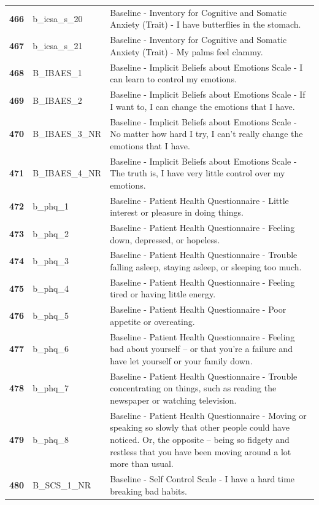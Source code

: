 \documentclass[
  letterpaper,
  DIV=11,
  numbers=noendperiod]{scrartcl}
\begin{document}
\begin{longtable}[t]{>{}cll}
\addlinespace
\textbf{466} & b\_icsa\_s\_20 & Baseline - Inventory for Cognitive and Somatic Anxiety (Trait) - I have butterflies in the stomach.\\
\textbf{467} & b\_icsa\_s\_21 & Baseline - Inventory for Cognitive and Somatic Anxiety (Trait) - My palms feel clammy.\\
\textbf{468} & B\_IBAES\_1 & Baseline - Implicit Beliefs about Emotions Scale - I can learn to control my emotions.\\
\textbf{469} & B\_IBAES\_2 & Baseline - Implicit Beliefs about Emotions Scale - If I want to, I can change the emotions that I have.\\
\textbf{470} & B\_IBAES\_3\_NR & Baseline - Implicit Beliefs about Emotions Scale - No matter how hard I try, I can’t really change the emotions that I have.\\
\addlinespace
\textbf{471} & B\_IBAES\_4\_NR & Baseline - Implicit Beliefs about Emotions Scale - The truth is, I have very little control over my emotions.\\
\textbf{472} & b\_phq\_1 & Baseline - Patient Health Questionnaire - Little interest or pleasure in doing things.\\
\textbf{473} & b\_phq\_2 & Baseline - Patient Health Questionnaire - Feeling down, depressed, or hopeless.\\
\textbf{474} & b\_phq\_3 & Baseline - Patient Health Questionnaire - Trouble falling asleep, staying asleep, or sleeping too much.\\
\textbf{475} & b\_phq\_4 & Baseline - Patient Health Questionnaire - Feeling tired or having little energy.\\
\addlinespace
\textbf{476} & b\_phq\_5 & Baseline - Patient Health Questionnaire - Poor appetite or overeating.\\
\textbf{477} & b\_phq\_6 & Baseline - Patient Health Questionnaire - Feeling bad about yourself -- or that you're a failure and have let yourself or your family down.\\
\textbf{478} & b\_phq\_7 & Baseline - Patient Health Questionnaire - Trouble concentrating on things, such as reading the newspaper or watching television.\\
\textbf{479} & b\_phq\_8 & Baseline - Patient Health Questionnaire - Moving or speaking so slowly that other people could have noticed. Or, the opposite -- being so fidgety and restless that you have been moving around a lot more than usual.\\
\textbf{480} & B\_SCS\_1\_NR & Baseline - Self Control Scale - I have a hard time breaking bad habits.\\

\end{longtable}
\end{document}
